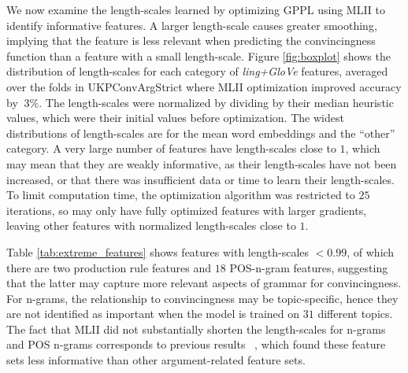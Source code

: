 We now examine the length-scales learned by optimizing GPPL using MLII  
to identify informative features. 
A larger length-scale causes greater smoothing, 
implying that the feature is less relevant when predicting the convincingness function
than a feature with a small length-scale. 
Figure \ref{fig:boxplot} shows the distribution of length-scales for each category of
\emph{ling+GloVe} features, averaged over the folds in UKPConvArgStrict where MLII
optimization improved accuracy by $\>3\%$. The length-scales
were normalized by dividing by their median heuristic values, 
which were their initial values before optimization.
The widest distributions of length-scales are for the mean word embeddings and the ``other'' category.
A very large number of features have length-scales close to $1$,
which may mean that they are weakly informative, as their length-scales have not been increased,
or that there was insufficient data or time to learn their length-scales.
To limit computation time, the optimization algorithm was restricted to $25$ iterations, 
so may only have fully optimized features with larger gradients, 
leaving other features with normalized length-scales close to $1$.
 
Table \ref{tab:extreme_features} shows features with length-scales $<0.99$,
of which there are two production rule features and $18$ POS-n-gram features,
suggesting that the latter may capture more relevant aspects of grammar for convincingness. 
For n-grams, the relationship to convincingness may be topic-specific, 
hence they are not identified as important when the model is trained on $31$ different topics. 
The fact that MLII did not substantially shorten the length-scales for n-grams and POS n-grams 
corresponds to previous results ~\cite{persing2017can}, which found these feature sets less informative than other argument-related feature sets.
 
